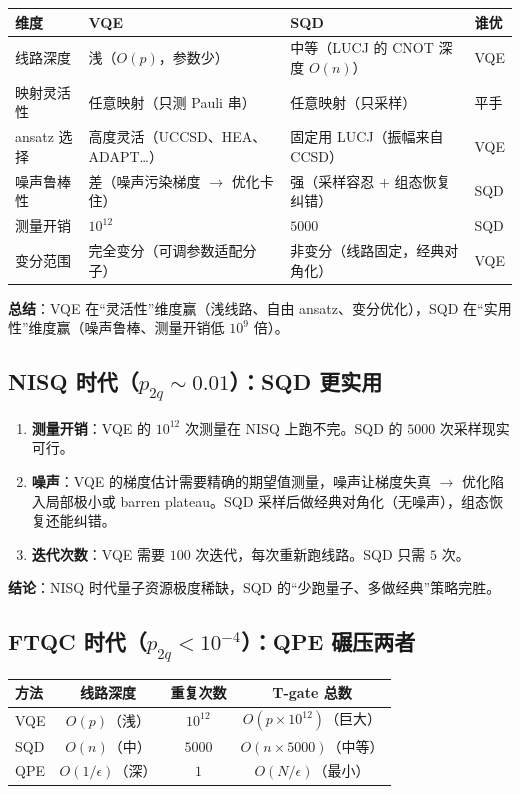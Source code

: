 \documentclass[11pt,a4paper]{article}
\begin{document}
\begin{center}
\begin{tabular}{llll}
  \toprule
  维度 & VQE & SQD & 谁优 \\
  \midrule
  线路深度 & 浅（$O(p)$，参数少） & 中等（LUCJ 的 CNOT 深度 $O(n)$） & VQE \\
  映射灵活性 & 任意映射（只测 Pauli 串） & 任意映射（只采样） & 平手 \\
  ansatz 选择 & 高度灵活（UCCSD、HEA、ADAPT…） & 固定用 LUCJ（振幅来自 CCSD） & VQE \\
  噪声鲁棒性 & 差（噪声污染梯度 $\to$ 优化卡住） & 强（采样容忍 + 组态恢复纠错） & SQD \\
  测量开销 & $10^{12}$ & $5000$ & SQD \\
  变分范围 & 完全变分（可调参数适配分子） & 非变分（线路固定，经典对角化） & VQE \\
  \bottomrule
\end{tabular}
\end{center}

\textbf{总结}：VQE 在``灵活性''维度赢（浅线路、自由 ansatz、变分优化），SQD 在``实用性''维度赢（噪声鲁棒、测量开销低 $10^9$ 倍）。

\subsection{NISQ 时代（$p_{2q} \sim 0.01$）：SQD 更实用}

\begin{enumerate}
  \item \textbf{测量开销}：VQE 的 $10^{12}$ 次测量在 NISQ 上跑不完。SQD 的 $5000$ 次采样现实可行。
  \item \textbf{噪声}：VQE 的梯度估计需要精确的期望值测量，噪声让梯度失真 $\to$ 优化陷入局部极小或 barren plateau。SQD 采样后做经典对角化（无噪声），组态恢复还能纠错。
  \item \textbf{迭代次数}：VQE 需要 $100$ 次迭代，每次重新跑线路。SQD 只需 $5$ 次。
\end{enumerate}

\textbf{结论}：NISQ 时代量子资源极度稀缺，SQD 的``少跑量子、多做经典''策略完胜。

\subsection{FTQC 时代（$p_{2q} < 10^{-4}$）：QPE 碾压两者}

\begin{center}
\begin{tabular}{lccc}
  \toprule
  方法 & 线路深度 & 重复次数 & T-gate 总数 \\
  \midrule
  VQE & $O(p)$（浅） & $10^{12}$ & $O(p \times 10^{12})$（巨大） \\
  SQD & $O(n)$（中） & $5000$ & $O(n \times 5000)$（中等） \\
  QPE & $O(1/\epsilon)$（深） & $1$ & $O(N/\epsilon)$（最小） \\
  \bottomrule
\end{tabular}
\end{center}
\end{document}
